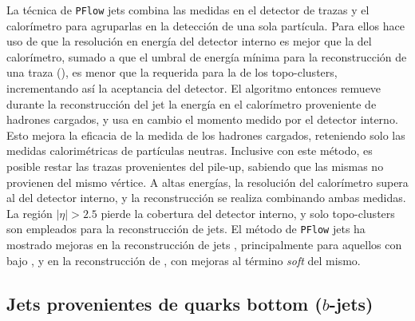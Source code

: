 La técnica de \texttt{PFlow} jets \cite{PERF-2015-09} combina las medidas en el detector de trazas y el calorímetro para agruparlas en la detección de una sola partícula. Para ellos hace uso de que la resolución en energía del detector interno es mejor que la del calorímetro, sumado a que el umbral de energía mínima para la reconstrucción de una traza (), es menor que la requerida para la de los topo-clusters, incrementando así la aceptancia del detector. El algoritmo entonces remueve durante la reconstrucción del jet la energía en el calorímetro proveniente de hadrones cargados, y usa en cambio el momento medido por el detector interno. Esto mejora la eficacia de la medida de los hadrones cargados, reteniendo solo las medidas calorimétricas de partículas neutras. Inclusive con este método, es posible restar las trazas provenientes del pile-up, sabiendo que las mismas no provienen del mismo vértice. A altas energías, la resolución del calorímetro supera al del detector interno, y la reconstrucción se realiza combinando ambas medidas. La región $|\eta|>2.5$ pierde la cobertura del detector interno, y solo topo-clusters son empleados para la reconstrucción de jets. El método de \texttt{PFlow} jets ha mostrado mejoras en la reconstrucción de jets \cite{PERF-2015-09}, principalmente para aquellos con bajo \pt, y en la reconstrucción de \met \cite{ATLAS-CONF-2018-023}, con mejoras al término \textit{soft} del mismo.


\subsection{Jets provenientes de quarks bottom ($b$-jets)}

